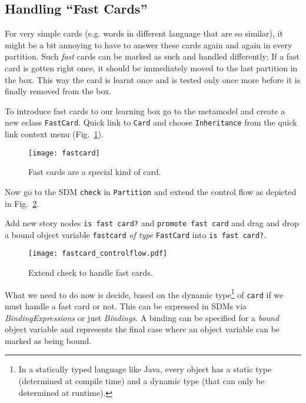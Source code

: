 \newpage
\subsection{Handling ``Fast Cards''}

For very simple cards (e.g. words in different language that are so similar), it might be a bit annoying to have to answer these cards again and again in every
partition. Such \emph{fast} cards can be marked as such and handled differently:  If a fast card is gotten right once, it should be immediately moved to the
last partition in the box. This way the card is learnt once and is tested only once more before it is finally removed from the box.

To introduce fast cards to our learning box go to the metamodel and create a new eclass \texttt{FastCard}. Quick link to \texttt{Card} and choose
\texttt{Inheritance} from the quick link context menu (Fig.~\ref{fig:sdm_fastcard_1}).

\begin{figure}[htp]
\begin{center}
  \texttt{[image: fastcard]}
  \caption{Fast cards are a special kind of card.}  
  \label{fig:sdm_fastcard_1}
\end{center}
\end{figure}

Now go to the SDM \texttt{check} in \texttt{Partition} and extend the control flow as depicted in Fig.~\ref{fig:sdm_fastcard_2}.
 
Add new story nodes \texttt{is fast card?} and \texttt{promote fast card} and drag and drop a bound object variable \texttt{fastcard} \emph{of type}
\texttt{FastCard} into \texttt{is fast card?}.

\begin{figure}[htbp]
\begin{center}
  \texttt{[image: fastcard\_controlflow.pdf]}
  \caption{Extend check to handle fast cards.}  
  \label{fig:sdm_fastcard_2}
\end{center}
\end{figure}

What we need to do now is decide, based on the dynamic type\footnote{In a statically typed language like Java, every object has a static type (determined at
compile time) and a dynamic type (that can only be determined at runtime).} of \texttt{card} if we must handle a fast card or not. This can be expressed in SDMs
via \emph{BindingExpressions} or just \emph{Bindings}. A binding can be specified for a \emph{bound} object variable  and represents the final
case where an object variable can be marked as being bound.

